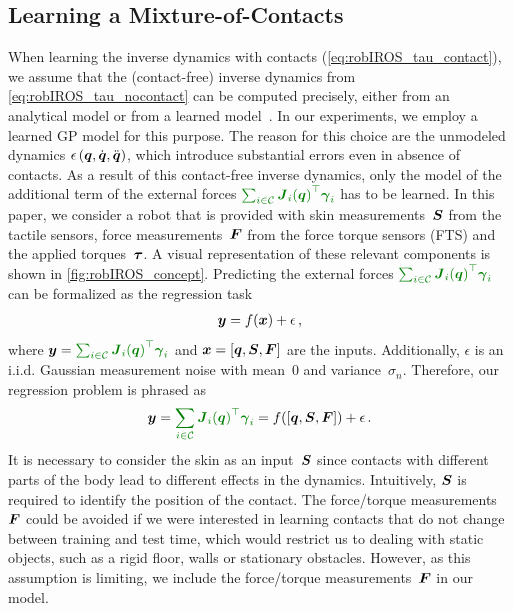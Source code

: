 \subsection{Learning a Mixture-of-Contacts}



	When learning the inverse dynamics with contacts (\eq\eqref{eq:robIROS_tau_contact}), we assume that the (contact-free) inverse dynamics from \eq\eqref{eq:robIROS_tau_nocontact} can be computed precisely, either from an analytical model or from a learned model~\cite{Nguyen-Tuong2011}.
    In our experiments, we employ a learned GP model for this purpose.
    The reason for this choice are the unmodeled dynamics $\epsilon\,(\boldsymbol q,\dot{\boldsymbol q},\ddot{\boldsymbol q})$, which introduce substantial errors even in absence of contacts.
	As a result of this contact-free inverse dynamics, only the model of the additional term of the external forces $\color{darkgreen}{\sum_{i \in\mathcal{C}} {\jacobian_i(\q)}\T \extForces_i}$ has to be learned.
    In this paper, we consider a robot that is provided with skin measurements~$\mathcal{\boldsymbol{S}}$ from the tactile sensors, force measurements~$\boldsymbol{F}$ from the force torque sensors (FTS) and the applied torques~$\boldsymbol{\tau}$.
    A visual representation of these relevant components is shown in \fig\ref{fig:robIROS_concept}.
	Predicting the external forces $\color{darkgreen}{\sum_{i \in\mathcal{C}} {\jacobian_i(\q)}\T \extForces_i}$ can be formalized as the regression task
	\begin{align}
		\boldsymbol y = f(\boldsymbol x) + \epsilon\,,
		\label{eq:generic_regression_noise}
	\end{align}
	where $\outputMatrix = \textcolor{darkgreen}{\sum_{i \in\mathcal{C}} {\jacobian_i(\q)}\T \extForces_i}$ and  $\boldsymbol x = [\boldsymbol q, \mathcal{\boldsymbol{S}},\boldsymbol{F}]$ are the inputs. 
	Additionally, $\epsilon$ is an i.i.d. Gaussian measurement noise with mean~$0$ and variance~$\sigma_n$.
	Therefore, our regression problem is phrased as
	\begin{align}
		\outputMatrix =\textcolor{darkgreen}{\sum_{i \in\mathcal{C}} {\jacobian_i(\q)}\T \extForces_i}  = \regressionNo([\q, \skinInput,\ftsForces]) + \epsilon\,.
		\label{eq:robIROS_regression}
	\end{align}
	It is necessary to consider the skin as an input~$\mathcal{\boldsymbol{S}}$ since contacts with different parts of the body lead to different effects in the dynamics.
	Intuitively, $\mathcal{\boldsymbol{S}}$ is required to identify the position of the contact.
	The force/torque measurements~$\boldsymbol{F}$ could be avoided if we were interested in learning contacts that do not change between training and test time, which would restrict us to dealing with static objects, such as a rigid floor, walls or stationary obstacles.
	However, as this assumption is limiting, we include the force/torque measurements~$\boldsymbol{F}$ in our model.

